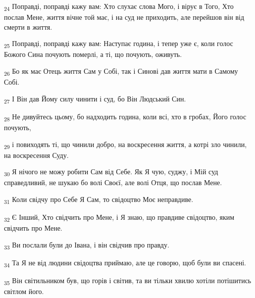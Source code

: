 \begin{tcolorbox}
\textsubscript{24} Поправді, поправді кажу вам: Хто слухає слова Мого, і вірує в Того, Хто послав Мене, життя вічне той має, і на суд не приходить, але перейшов він від смерти в життя.
\end{tcolorbox}
\begin{tcolorbox}
\textsubscript{25} Поправді, поправді кажу вам: Наступає година, і тепер уже є, коли голос Божого Сина почують померлі, а ті, що почують, оживуть.
\end{tcolorbox}
\begin{tcolorbox}
\textsubscript{26} Бо як має Отець життя Сам у Собі, так і Синові дав життя мати в Самому Собі.
\end{tcolorbox}
\begin{tcolorbox}
\textsubscript{27} І Він дав Йому силу чинити і суд, бо Він Людський Син.
\end{tcolorbox}
\begin{tcolorbox}
\textsubscript{28} Не дивуйтесь цьому, бо надходить година, коли всі, хто в гробах, Його голос почують,
\end{tcolorbox}
\begin{tcolorbox}
\textsubscript{29} і повиходять ті, що чинили добро, на воскресення життя, а котрі зло чинили, на воскресення Суду.
\end{tcolorbox}
\begin{tcolorbox}
\textsubscript{30} Я нічого не можу робити Сам від Себе. Як Я чую, суджу, і Мій суд справедливий, не шукаю бо волі Своєї, але волі Отця, що послав Мене.
\end{tcolorbox}
\begin{tcolorbox}
\textsubscript{31} Коли свідчу про Себе Я Сам, то свідоцтво Моє неправдиве.
\end{tcolorbox}
\begin{tcolorbox}
\textsubscript{32} Є Інший, Хто свідчить про Мене, і Я знаю, що правдиве свідоцтво, яким свідчить про Мене.
\end{tcolorbox}
\begin{tcolorbox}
\textsubscript{33} Ви послали були до Івана, і він свідчив про правду.
\end{tcolorbox}
\begin{tcolorbox}
\textsubscript{34} Та Я не від людини свідоцтва приймаю, але це говорю, щоб були ви спасені.
\end{tcolorbox}
\begin{tcolorbox}
\textsubscript{35} Він світильником був, що горів і світив, та ви тільки хвилю хотіли потішитись світлом його.
\end{tcolorbox}

